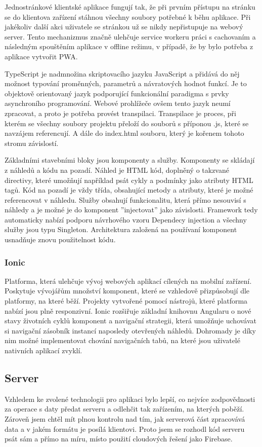 \documentclass[
  glossaries,
]{kidiplom}
\begin{document}
Jednostránkové klientské aplikace fungují tak, že při prvním přístupu na stránku se do klientova zařízení stáhnou všechny soubory potřebné k běhu aplikace. Při jakékoliv další akci uživatele se stránkou už se nikdy nepřistupuje na webový server. Tento mechanizmus značně ulehčuje service workeru práci s cachovaním a následným spouštěním aplikace v offline režimu, v případě, že by bylo potřeba z aplikace vytvořit PWA.

TypeScript je nadmnožina skriptovacího jazyku JavaScript a přidává do něj možnost typování proměnných, parametrů a návratových hodnot funkcí. Je to objektově orientovaný jazyk podporující funkcionální paradigma s prvky asynchroního programování. Webové prohlížeče ovšem tento jazyk neumí zpracovat, a proto je potřeba provést transpilaci. Transpilace je proces, při kterém se všechny soubory projektu přeloží do souborů s příponou .js, které se navzájem referencují. A dále do index.html souboru, který je kořenem tohoto stromu závislostí.

Základními stavebními bloky jsou komponenty a služby. Komponenty se skládají z náhledů a kódu na pozadí. Náhled je HTML kód, doplněný o takzvané directivy, které umožňují například psát cykly a podmínky jako atributy HTML tagů. Kód na pozadí je vždy třída, obsahující metody a atributy, které je možné referencovat v náhledu. Služby obsahují funkcionalitu, která přímo nesouvisí s náhledy a je možné je do komponent ''injectovat'' jako závislosti. \cite{9} Framework tedy automaticky nabízí podporu návrhového vzoru Dependecy injection a všechny služby jsou typu Singleton. Architektura založená na používaní komponent usnadňuje znovu použitelnost kódu.

\subsubsection{Ionic}
Platforma, která ulehčuje vývoj webových aplikací cílených na mobilní zařízení. Poskytuje vývojářům množství komponent, které se vzhledově přizpůsobují dle platformy, na které běží. Projekty vytvořené pomocí nástrojů, které platforma nabízí jsou plně responzivní. Ionic rozšiřuje základní knihovnu Angularu o nové stavy životních cyklů komponent a navigační strategii, která umožňuje uchovávat si navigační zásobník instancí naposledy otevřených náhledů. Dohromady je díky nim možné implementovat chování navigačních tabů, na které jsou uživatelé nativních aplikací zvyklí. 

\subsection{Server}
Vzhledem ke zvolené technologii pro aplikaci bylo lepší, co nejvíce zodpovědnosti za operace s daty předat serveru a odlehčit tak zařízením, na kterých poběží. Zároveň jsem chtěl mít plnou kontrolu nad tím, jak serverová část zpracovává data a v jakém formátu je posílá klientovi. Proto jsem se rozhodl kód serveru psát sám a přímo na míru, místo použití cloudových řešení jako Firebase. 
\end{document}
